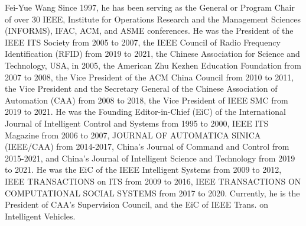 \documentclass[lettersize,journal]{IEEEtran}
\begin{document}
\begin{IEEEbiography}{Fei-Yue Wang}
Since 1997, he has been serving as the General or Program Chair of over 30 IEEE, Institute for Operations Research and the Management Sciences (INFORMS), IFAC, ACM, and ASME conferences. He was the President of the IEEE ITS Society from 2005 to 2007, the IEEE Council of Radio Frequency Identification (RFID) from 2019 to 2021, the Chinese Association for Science and Technology, USA, in 2005, the American Zhu Kezhen Education Foundation from 2007 to 2008, the Vice President of the ACM China Council from 2010 to 2011, the Vice President and the Secretary General of the Chinese Association of Automation (CAA) from 2008 to 2018, the Vice President of IEEE SMC from 2019 to 2021. He was the Founding Editor-in-Chief (EiC) of the International Journal of Intelligent Control and Systems from 1995 to 2000, IEEE ITS Magazine from 2006 to 2007, JOURNAL OF AUTOMATICA SINICA (IEEE/CAA) from 2014-2017, China's Journal of Command and Control from 2015-2021, and China's Journal of Intelligent Science and Technology from 2019 to 2021. He was the EiC of the IEEE Intelligent Systems from 2009 to 2012, IEEE TRANSACTIONS on ITS from 2009 to 2016, IEEE TRANSACTIONS ON COMPUTATIONAL SOCIAL SYSTEMS from 2017 to 2020. Currently, he is the President of CAA's Supervision Council, and the EiC of IEEE Trans. on Intelligent Vehicles.
\end{IEEEbiography}



\vfill
\end{document}
